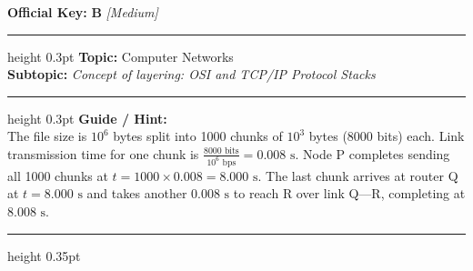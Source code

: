 \documentclass[a4paper,10pt]{article}
\begin{document}
\begin{tcolorbox}
\textbf{Official Key:} \textbf{\large B} \hfill \textit{\small [Medium]}
\vspace{2pt}\hrule height 0.3pt\vspace{3pt}
\textbf{Topic:} Computer Networks \\
\textbf{Subtopic:} \textit{Concept of layering: OSI and TCP/IP Protocol Stacks}
\vspace{2pt}\hrule height 0.3pt\vspace{3pt}
\textbf{Guide / Hint:} \\
{\small The file size is $10^6$ bytes split into 1000 chunks of $10^3$ bytes ($8000$ bits) each. Link transmission time for one chunk is $\frac{8000\text{ bits}}{10^6\text{ bps}} = 0.008\text{ s}$. Node P completes sending all 1000 chunks at $t = 1000 \times 0.008 = 8.000\text{ s}$. The last chunk arrives at router Q at $t = 8.000\text{ s}$ and takes another $0.008\text{ s}$ to reach R over link Q---R, completing at $8.008\text{ s}$.}

\end{tcolorbox}
\vspace{6pt}\hrule height 0.35pt\vspace{6pt}
\noindent
\end{document}
